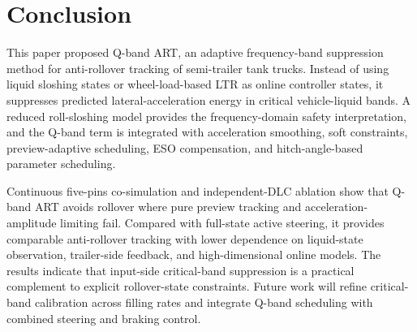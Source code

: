 \section{Conclusion}
This paper proposed Q-band ART, an adaptive frequency-band suppression method for anti-rollover tracking of semi-trailer tank trucks. Instead of using liquid sloshing states or wheel-load-based LTR as online controller states, it suppresses predicted lateral-acceleration energy in critical vehicle-liquid bands. A reduced roll-sloshing model provides the frequency-domain safety interpretation, and the Q-band term is integrated with acceleration smoothing, soft constraints, preview-adaptive scheduling, ESO compensation, and hitch-angle-based parameter scheduling.

Continuous five-pins co-simulation and independent-DLC ablation show that Q-band ART avoids rollover where pure preview tracking and acceleration-amplitude limiting fail. Compared with full-state active steering, it provides comparable anti-rollover tracking with lower dependence on liquid-state observation, trailer-side feedback, and high-dimensional online models. The results indicate that input-side critical-band suppression is a practical complement to explicit rollover-state constraints. Future work will refine critical-band calibration across filling rates and integrate Q-band scheduling with combined steering and braking control.
